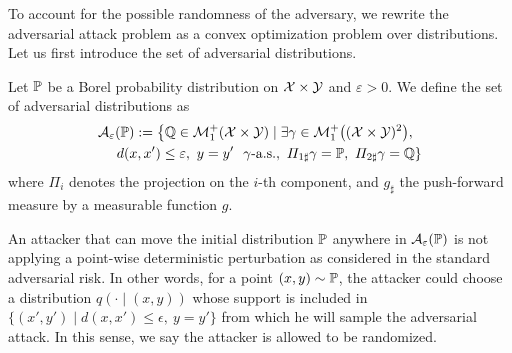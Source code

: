 To account for the possible randomness of the adversary, we rewrite the adversarial attack problem as a convex optimization problem over distributions. Let us first introduce the set of adversarial distributions.
\begin{definition}
Let $\mathbb{P}$ be a Borel probability distribution on $\mathcal{X}\times\mathcal{Y}$ and $\varepsilon>0$. We define the set of adversarial distributions as
\begin{align*}
\mathcal{A}_{\varepsilon}&(\PP) := \left\{\QQ\in\mathcal{M}^+_1(\XX\times\YY)\mid\exists \gamma\in\mathcal{M}^+_1\left((\XX\times\YY)^2\right),\right.\\
&\left.d(x,x')\leq\varepsilon,~y=y'~~ \gamma\text{-a.s.},~\Pi_{1\sharp}\gamma=\PP,~\Pi_{2\sharp}\gamma=\QQ\right\} 
\end{align*}
where $\Pi_i$ denotes the projection on the $i$-th component, and $g_\sharp$ the push-forward measure by a measurable function $g$.
\end{definition}
An attacker that can move the initial distribution $\mathbb{P}$ anywhere in $\mathcal{A}_\varepsilon(\mathbb{P})$ is not applying a point-wise deterministic perturbation as considered in the standard adversarial risk. %
In other words, for a point $(x,y)\sim\mathbb{P}$, the attacker could choose a distribution $q(\cdot\mid(x,y))$ whose support is included in $\{(x',y')\mid d(x,x')\leq \epsilon,~y=y'\}$ from which he will sample the adversarial attack. In this sense, we say the attacker is allowed to be randomized.

